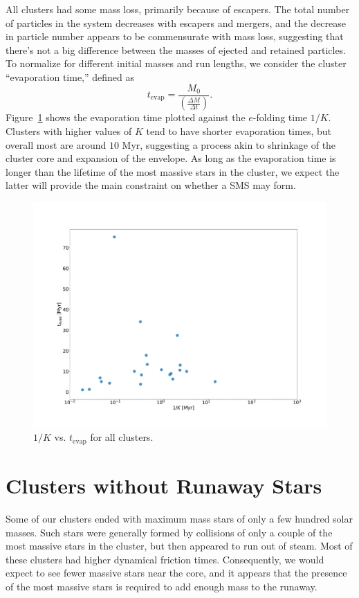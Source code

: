 \documentclass{princeton_astro_thesis}
\newcommand\Myr{\mbox{ Myr}}
\numberwithin{equation}{section}
\begin{document}
All clusters had some mass loss, primarily because of escapers. The total number of particles in the system decreases with escapers and mergers, and the decrease in particle number appears to be commensurate with mass loss, suggesting that there's not a big difference between the masses of ejected and retained particles. To normalize for different initial masses and run lengths, we consider the cluster ``evaporation time,'' defined as 
\begin{equation}
    t_{\mathrm{evap}} = \frac{M_{0}}{\left(\frac{\Delta M}{\Delta t}\right)}.
\end{equation}
Figure~\ref{fig:EvapKplot} shows the evaporation time plotted against the $e$-folding time $1/K$. Clusters with higher values of $K$ tend to have shorter evaporation times, but overall most are around $10 \Myr$, suggesting a process akin to shrinkage of the cluster core and expansion of the envelope.
As long as the evaporation time is longer than the lifetime of the most massive stars in the cluster, we expect the latter will provide the main constraint on whether a SMS may form.
\begin{figure}
\centering
\includegraphics[width=\textwidth]{kevap}
\caption{$1/K$ vs. $t_{\mathrm{evap}}$ for all clusters.}
\label{fig:EvapKplot}
\end{figure}

\section{Clusters without Runaway Stars}
Some of our clusters ended with maximum mass stars of only a few hundred solar masses. Such stars were generally formed by collisions of only a couple of the most massive stars in the cluster, but then appeared to run out of steam. Most of these clusters had higher dynamical friction times.  Consequently, we would expect to see fewer massive stars near the core, and it appears that the presence of the most massive stars is required to add enough mass to the runaway. 
\end{document}
